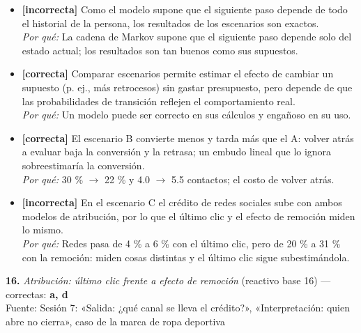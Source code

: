 \documentclass[10pt,letterpaper]{article}
\begin{document}
\begin{itemize}[leftmargin=1.2em,itemsep=0pt,topsep=1pt,parsep=0pt]
\item[\textbf{a)}] {\footnotesize \textbf{[incorrecta]} Como el modelo supone que el siguiente paso depende de todo el historial de la persona, los resultados de los escenarios son exactos.\\ \textit{Por qué:} La cadena de Markov supone que el siguiente paso depende solo del estado actual; los resultados son tan buenos como sus supuestos.}
\item[\textbf{b)}] {\footnotesize \textbf{[correcta]} Comparar escenarios permite estimar el efecto de cambiar un supuesto (p. ej., más retrocesos) sin gastar presupuesto, pero depende de que las probabilidades de transición reflejen el comportamiento real.\\ \textit{Por qué:} Un modelo puede ser correcto en sus cálculos y engañoso en su uso.}
\item[\textbf{c)}] {\footnotesize \textbf{[correcta]} El escenario B convierte menos y tarda más que el A: volver atrás a evaluar baja la conversión y la retrasa; un embudo lineal que lo ignora sobreestimaría la conversión.\\ \textit{Por qué:} 30 \% $\to$ 22 \% y 4.0 $\to$ 5.5 contactos; el costo de volver atrás.}
\item[\textbf{d)}] {\footnotesize \textbf{[incorrecta]} En el escenario C el crédito de redes sociales sube con ambos modelos de atribución, por lo que el último clic y el efecto de remoción miden lo mismo.\\ \textit{Por qué:} Redes pasa de 4 \% a 6 \% con el último clic, pero de 20 \% a 31 \% con la remoción: miden cosas distintas y el último clic sigue subestimándola.}
\end{itemize}
\vspace{3pt}\noindent\textbf{16.} \textit{Atribución: último clic frente a efecto de remoción} (reactivo base 16) — correctas: \textbf{a, d}\\[-1pt]
{\scriptsize Fuente: Sesión 7: «Salida: ¿qué canal se lleva el crédito?», «Interpretación: quien abre no cierra», caso de la marca de ropa deportiva}
\end{document}
